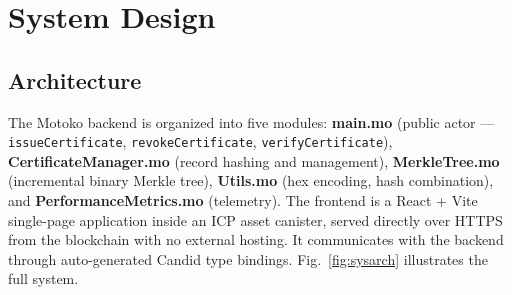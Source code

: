 \documentclass[conference,a4paper]{IEEEtran}
\begin{document}
\section{System Design}
\label{sec:design}

\subsection{Architecture}
The Motoko backend is organized into five modules: \textbf{main.mo} (public actor — \texttt{issueCertificate}, \texttt{revokeCertificate}, \texttt{verifyCertificate}), \textbf{CertificateManager.mo} (record hashing and management), \textbf{MerkleTree.mo} (incremental binary Merkle tree), \textbf{Utils.mo} (hex encoding, hash combination), and \textbf{PerformanceMetrics.mo} (telemetry). The frontend is a React + Vite single-page application inside an ICP asset canister, served directly over HTTPS from the blockchain with no external hosting. It communicates with the backend through auto-generated Candid type bindings. Fig.~\ref{fig:sysarch} illustrates the full system.
\end{document}
